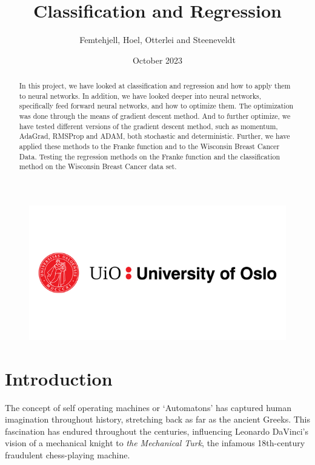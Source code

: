 \documentclass{article}
\title{Classification and Regression}
\author{Femtehjell, Hoel, Otterlei and Steeneveldt}
\date{October 2023}
\theoremstyle{definition}
\begin{document}

\maketitle
\begin{figure}[H]
    \centering
    \includegraphics[scale=0.5]{1797261_uio-logo.png}
\end{figure}
\newpage
\tableofcontents
\listoffigures


\newpage

\begin{abstract}
    In this project, we have looked at classification and regression and how to apply them to neural networks. In addition, we have looked deeper into neural networks, specifically feed forward neural networks, and how to optimize them. The optimization was done through the means of gradient descent method. And to further optimize, we have tested different versions of the gradient descent method, such as momentum, AdaGrad, RMSProp and ADAM, both stochastic and deterministic. Further, we have applied these methods to the Franke function and to the Wisconsin Breast Cancer Data. Testing the regression methods on the Franke function and the classification method on the Wisconsin Breast Cancer data set.
\end{abstract}

\section{Introduction}
The concept of self operating machines or `Automatons' has captured human imagination throughout history, stretching back as far as the ancient Greeks. This fascination has endured throughout the centuries, influencing Leonardo DaVinci's vision of a mechanical knight to \textit{the Mechanical Turk}, the infamous 18th-century fraudulent chess-playing machine.
\end{document}
